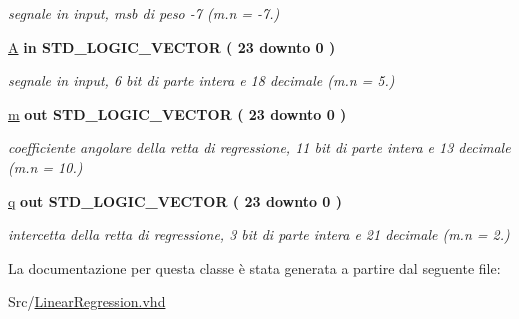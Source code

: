 \begin{DoxyCompactItemize}
\begin{DoxyCompactList}\small\item\em segnale in input, msb di peso -\/7 (m.\+n = -\/7.) \end{DoxyCompactList}\item 
\hyperlink{group___linear_regression_gae1ad6503d157f6c26abdce1131d31ec2}{A}  {\bfseries {\bfseries \textcolor{vhdlchar}{in}\textcolor{vhdlchar}{ }}} {\bfseries \textcolor{vhdlchar}{S\+T\+D\+\_\+\+L\+O\+G\+I\+C\+\_\+\+V\+E\+C\+T\+O\+R}\textcolor{vhdlchar}{ }\textcolor{vhdlchar}{(}\textcolor{vhdlchar}{ }\textcolor{vhdlchar}{ } \textcolor{vhdldigit}{23} \textcolor{vhdlchar}{ }\textcolor{vhdlchar}{downto}\textcolor{vhdlchar}{ }\textcolor{vhdlchar}{ } \textcolor{vhdldigit}{0} \textcolor{vhdlchar}{ }\textcolor{vhdlchar}{)}\textcolor{vhdlchar}{ }} 
\begin{DoxyCompactList}\small\item\em segnale in input, 6 bit di parte intera e 18 decimale (m.\+n = 5.) \end{DoxyCompactList}\item 
\hyperlink{group___linear_regression_gad943f01112876248a4734aa3c3d2e3f2}{m}  {\bfseries {\bfseries \textcolor{vhdlchar}{out}\textcolor{vhdlchar}{ }}} {\bfseries \textcolor{vhdlchar}{S\+T\+D\+\_\+\+L\+O\+G\+I\+C\+\_\+\+V\+E\+C\+T\+O\+R}\textcolor{vhdlchar}{ }\textcolor{vhdlchar}{(}\textcolor{vhdlchar}{ }\textcolor{vhdlchar}{ } \textcolor{vhdldigit}{23} \textcolor{vhdlchar}{ }\textcolor{vhdlchar}{downto}\textcolor{vhdlchar}{ }\textcolor{vhdlchar}{ } \textcolor{vhdldigit}{0} \textcolor{vhdlchar}{ }\textcolor{vhdlchar}{)}\textcolor{vhdlchar}{ }} 
\begin{DoxyCompactList}\small\item\em coefficiente angolare della retta di regressione, 11 bit di parte intera e 13 decimale (m.\+n = 10.) \end{DoxyCompactList}\item 
\hyperlink{group___linear_regression_gacec4f4b6d139d1ada088ca2d3d881418}{q}  {\bfseries {\bfseries \textcolor{vhdlchar}{out}\textcolor{vhdlchar}{ }}} {\bfseries \textcolor{vhdlchar}{S\+T\+D\+\_\+\+L\+O\+G\+I\+C\+\_\+\+V\+E\+C\+T\+O\+R}\textcolor{vhdlchar}{ }\textcolor{vhdlchar}{(}\textcolor{vhdlchar}{ }\textcolor{vhdlchar}{ } \textcolor{vhdldigit}{23} \textcolor{vhdlchar}{ }\textcolor{vhdlchar}{downto}\textcolor{vhdlchar}{ }\textcolor{vhdlchar}{ } \textcolor{vhdldigit}{0} \textcolor{vhdlchar}{ }\textcolor{vhdlchar}{)}\textcolor{vhdlchar}{ }} 
\begin{DoxyCompactList}\small\item\em intercetta della retta di regressione, 3 bit di parte intera e 21 decimale (m.\+n = 2.) \end{DoxyCompactList}\end{DoxyCompactItemize}


La documentazione per questa classe è stata generata a partire dal seguente file\+:\begin{DoxyCompactItemize}
\item 
Src/\hyperlink{_linear_regression_8vhd}{Linear\+Regression.\+vhd}\end{DoxyCompactItemize}
